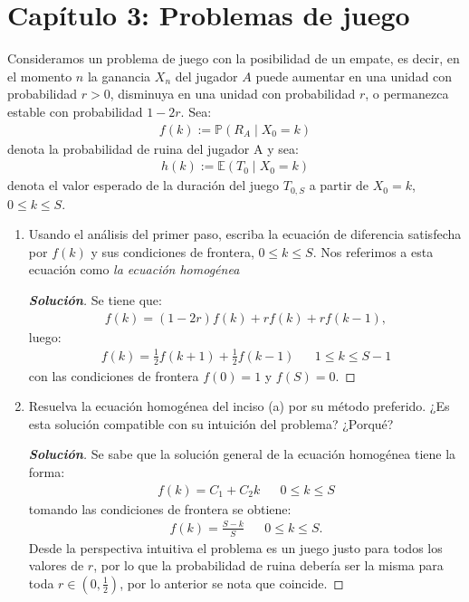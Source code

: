 \documentclass[12pt, letterpaper]{article}
\newcommand{\p}{\mathbb{P}}
\newenvironment{manualtheorem}[1]{%
  \renewcommand\themanualtheoreminner{#1}%
  \manualtheoreminner
}{\endmanualtheoreminner}
\newenvironment{solucion}
  {\renewcommand\qedsymbol{$\square$}\begin{proof}[\textbf{Solución}]}
  {\end{proof}}
\begin{document}
    \section*{Capítulo 3: Problemas de juego}
    \begin{manualtheorem}{3.1} Consideramos un problema de juego con la posibilidad de un empate, es decir, en el momento $n$ la ganancia $X_n$ del jugador $A$ puede aumentar en una unidad con probabilidad $r> 0$, disminuya en una unidad con probabilidad $r$, o permanezca estable con probabilidad $1 - 2r$. Sea:
    \begin{align*}
        f(k):=\p(R_A \mid X_0=k)
    \end{align*}
    denota la probabilidad de ruina del jugador A y sea:
    \begin{align*}
        h(k):=\mathbb{E}(T_0 \mid X_0=k)
    \end{align*}
    denota el valor esperado de la duración del juego $T_{0,S}$ a partir de $X_0=k$, $0\leq k \leq S$.
    
    \renewcommand{\labelenumi}{(\alph{enumi})}
    \begin{enumerate}
        
        \item Usando el análisis del primer paso, escriba la ecuación de diferencia satisfecha por $f(k)$ y sus condiciones de frontera, $0 \leq k \leq S$. Nos referimos a esta ecuación como \textit{la ecuación homogénea}
        \begin{solucion}
            Se tiene que:
            \begin{align*}
                f(k)=(1-2r)f(k)+rf(k)+rf(k-1),
            \end{align*}
            luego:
            \begin{align*}
                f(k)= \frac{1}{2} f(k+1)+ \frac{1}{2}f(k-1)& &1\leq k\leq S-1
            \end{align*}
            con las condiciones de frontera $f(0)=1$ y $f(S)=0$.
        \end{solucion}
        
        \item Resuelva la ecuación homogénea del inciso (a) por su método preferido. ¿Es esta solución compatible con su intuición del problema? ¿Porqué?
        \begin{solucion}
            Se sabe que la solución general de la ecuación homogénea tiene la forma:
            \begin{align*}
                f(k)=C_1+C_2k & &  0\leq k\leq S
            \end{align*}
            tomando las condiciones de frontera se obtiene:
            \begin{align*}
                f(k)=\frac{S-k}{S} & &  0\leq k\leq S.
            \end{align*}
            Desde la perspectiva intuitiva el problema es un juego justo para todos los valores de $r$, por lo que la probabilidad de ruina debería ser la misma para toda $r\in(0,\frac{1}{2})$, por lo anterior se nota que coincide.
        \end{solucion}
        

\end{enumerate}
\end{manualtheorem}
\end{document}
